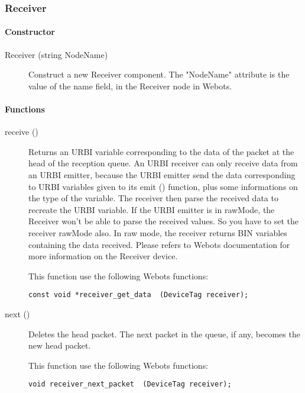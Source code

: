 \subsubsection{Receiver}
\label{webots.uobjects.robotdevices.receiver}%

\paragraph{Constructor}
\label{webots.uobjects.robotdevices.receiver.constructor}%

\noindent
\begin{description}
\item[{Receiver (string NodeName)}] Construct a new Receiver component. The "NodeName" attribute is the value
          of the name field, in the Receiver node in Webots.

\end{description}

\paragraph{Functions}
\label{webots.uobjects.robotdevices.receiver.functions}%

\noindent
\begin{description}
\item[{receive ()}] Returns an URBI variable corresponding to the data
  of the packet at the head of the reception queue. An URBI receiver
  can only receive data from an URBI emitter, because the URBI emitter
  send the data corresponding to URBI variables given to its emit ()
  function, plus some informations on the type of the variable. The
  receiver then parse the received data to recreate the URBI variable.
  If the URBI emitter is in rawMode, the Receiver won't be able to
  parse the received values.  So you have to set the receiver rawMode
  also. In raw mode, the receiver returns BIN variables containing the
  data received.  Please refers to Webots documentation for more
  information on the Receiver device.


          This function use the following Webots functions:


\begin{lstlisting}[firstnumber=1,]
const void *receiver_get_data  (DeviceTag receiver);
\end{lstlisting}
\item[{next ()}]           Deletes the head packet. The next packet in the queue, if any, becomes the
           new head packet.


          This function use the following Webots functions:


\begin{lstlisting}[firstnumber=1,]
void receiver_next_packet  (DeviceTag receiver);
\end{lstlisting}
\end{description}

